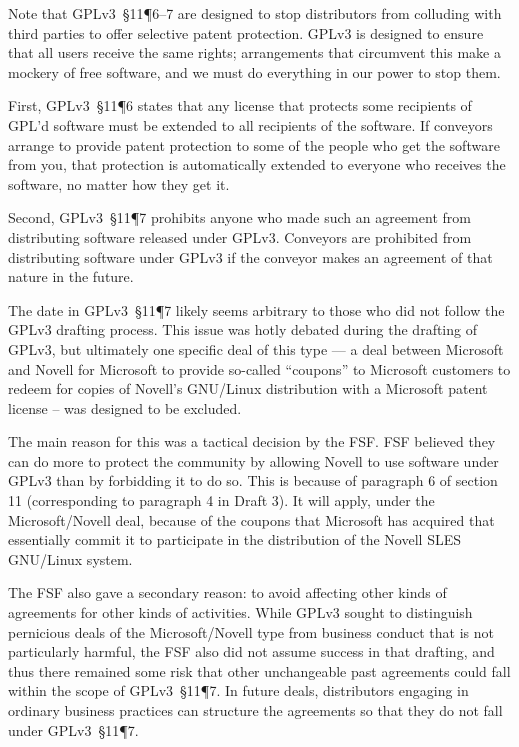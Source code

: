 Note that GPLv3~\S11\P6--7 are designed to stop distributors from colluding with
third parties to offer selective patent protection.  GPLv3 is designed to
ensure that all users receive the same rights; arrangements that circumvent
this make a mockery of free software, and we must do everything in our power
to stop them.

First, GPLv3~\S11\P6 states that any license that protects some recipients of
GPL'd software must be extended to all recipients of the software.  
If conveyors arrange to provide patent
protection to some of the people who get the software from you, that
protection is automatically extended to everyone who receives the software,
no matter how they get it. 

Second, GPLv3~\S11\P7
prohibits anyone who made such an agreement from distributing software
released under GPLv3.  Conveyors are prohibited from
distributing software under GPLv3 if the conveyor makes an agreement of that
nature in the future.

The date in GPLv3~\S11\P7 likely seems arbitrary to those who did not follow
the GPLv3 drafting process.  This issue was hotly debated during the drafting of
GPLv3, but ultimately one specific deal of this type --- a deal between Microsoft
and Novell for Microsoft to provide so-called ``coupons'' to Microsoft customers to redeem
for copies of Novell's GNU/Linux distribution with a Microsoft patent license -- was
designed to be excluded.

The main reason for this was a tactical decision by the FSF.  FSF believed they can do more to
protect the community by allowing Novell to use software under GPLv3
than by forbidding it to do so.  This is because of
paragraph 6 of section 11 (corresponding to paragraph 4 in Draft 3).
It will apply, under the Microsoft/Novell deal, because of the coupons
that Microsoft has acquired that essentially commit it to participate
in the distribution of the Novell SLES GNU/Linux system.

The FSF also gave a secondary reason:  to avoid affecting other kinds of agreements for
other kinds of activities.  While GPLv3 sought to 
distinguish pernicious deals of the Microsoft/Novell type from
business conduct that is not particularly harmful, the FSF also did not
assume success in that drafting, and thus there remained some risk that other
unchangeable past agreements could fall within the  scope of GPLv3~\S11\P7.
In future deals, distributors engaging in ordinary business practices
can structure the agreements so that they do not fall under GPLv3~\S11\P7.

